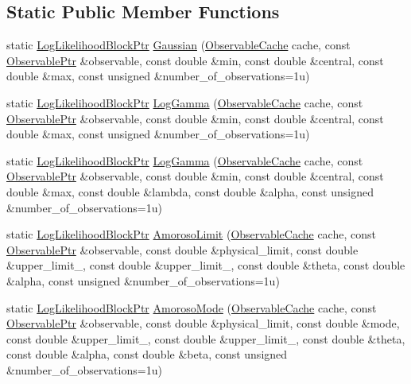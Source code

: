 \subsection*{Static Public Member Functions}
\begin{DoxyCompactItemize}
\item 
static \hyperlink{namespaceeos_ab823a6782e060c440e05a614158ad1bf}{LogLikelihoodBlockPtr} \hyperlink{classeos_1_1LogLikelihoodBlock_a848066ee04c104fdcf0b74c868c87d68}{Gaussian} (\hyperlink{classeos_1_1ObservableCache}{ObservableCache} cache, const \hyperlink{namespaceeos_a470e5dd806bd129080f1aa0c2954646f}{ObservablePtr} \&observable, const double \&min, const double \&central, const double \&max, const unsigned \&number\_\-of\_\-observations=1u)
\item 
static \hyperlink{namespaceeos_ab823a6782e060c440e05a614158ad1bf}{LogLikelihoodBlockPtr} \hyperlink{classeos_1_1LogLikelihoodBlock_a3e2ab2f3d4d994c382ecc06cd6453478}{LogGamma} (\hyperlink{classeos_1_1ObservableCache}{ObservableCache} cache, const \hyperlink{namespaceeos_a470e5dd806bd129080f1aa0c2954646f}{ObservablePtr} \&observable, const double \&min, const double \&central, const double \&max, const unsigned \&number\_\-of\_\-observations=1u)
\item 
static \hyperlink{namespaceeos_ab823a6782e060c440e05a614158ad1bf}{LogLikelihoodBlockPtr} \hyperlink{classeos_1_1LogLikelihoodBlock_ac4c4437c0d679ae36db0fe6906532f2d}{LogGamma} (\hyperlink{classeos_1_1ObservableCache}{ObservableCache} cache, const \hyperlink{namespaceeos_a470e5dd806bd129080f1aa0c2954646f}{ObservablePtr} \&observable, const double \&min, const double \&central, const double \&max, const double \&lambda, const double \&alpha, const unsigned \&number\_\-of\_\-observations=1u)
\item 
static \hyperlink{namespaceeos_ab823a6782e060c440e05a614158ad1bf}{LogLikelihoodBlockPtr} \hyperlink{classeos_1_1LogLikelihoodBlock_a275a00c674dbc595abb1bc74faed20be}{AmorosoLimit} (\hyperlink{classeos_1_1ObservableCache}{ObservableCache} cache, const \hyperlink{namespaceeos_a470e5dd806bd129080f1aa0c2954646f}{ObservablePtr} \&observable, const double \&physical\_\-limit, const double \&upper\_\-limit\_, const double \&upper\_\-limit\_, const double \&theta, const double \&alpha, const unsigned \&number\_\-of\_\-observations=1u)
\item 
static \hyperlink{namespaceeos_ab823a6782e060c440e05a614158ad1bf}{LogLikelihoodBlockPtr} \hyperlink{classeos_1_1LogLikelihoodBlock_a810a57eac9ccdc9cb7e49f0197adcee5}{AmorosoMode} (\hyperlink{classeos_1_1ObservableCache}{ObservableCache} cache, const \hyperlink{namespaceeos_a470e5dd806bd129080f1aa0c2954646f}{ObservablePtr} \&observable, const double \&physical\_\-limit, const double \&mode, const double \&upper\_\-limit\_, const double \&upper\_\-limit\_, const double \&theta, const double \&alpha, const double \&beta, const unsigned \&number\_\-of\_\-observations=1u)

\end{DoxyCompactItemize}
